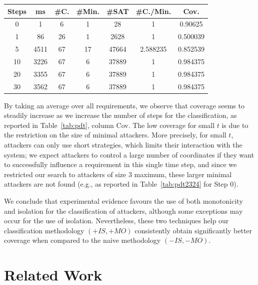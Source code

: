 {\begin{table}[!t]
\begin{minipage}{0.45\textwidth}
{\begin{tabular}{|c|c|c|c|c|c|c|}
\hline
Steps & ms &  \#C. & \#Min. & \#SAT & \#C./Min. & Cov.\\
\hline
0 & 1 & 6 & 1 & 28 & 1 & 0.90625\\
1 & 86 & 26 & 1 & 2628 & 1 & 0.500039\\
5 & 4511 & 67 & 17 & 47664 & 2.588235 & 0.852539\\
10 & 3226 & 67 & 6 & 37889 & 1 & 0.984375\\
20 & 3355 & 67 & 6 & 37889 & 1 & 0.984375\\
30 & 3562 & 67 & 6 & 37889 & 1 & 0.984375\\
 \hline
\end{tabular}
}
\label{tab:pdt2367}
\end{minipage}
\end{table}
By taking an average over all requirements, we observe that coverage seems to steadily increase as we increase the number of steps for the classification, as reported in Table~\ref{tab:pdt}, column Cov. The low coverage for small $t$ is due to the restriction on the size of minimal attackers. More precisely, for small $t$, attackers can only use short strategies, which limits their interaction with the system; we expect attackers to control a large number of coordinates if they want to successfully influence a requirement in this single time step, and since we restricted our search to attackers of size 3 maximum, these larger minimal attackers are not found (e.g., as reported in Table~\ref{tab:pdt2324} for Step 0).

We conclude that experimental evidence favours the use of both monotonicity and isolation for the classification of attackers, although  some exceptions may occur for the use of isolation. Nevertheless, these two techniques help our classification methodology $(+IS,+MO)$ consistently obtain significantly better coverage when compared to the naive methodology $(-IS,-MO)$.

\section{Related Work}
\label{sec:discussion}

}
